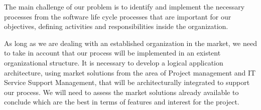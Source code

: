 The main challenge of our problem is to identify and implement the necessary processes from the software life cycle processes that are important for our objectives, defining activities and responsibilities inside the organization.\par
As long as we are dealing with an established organization in the market, we need to take in account that our process will be implemented in an existent organizational structure. It is necessary to develop a logical application architecture, using market solutions from the area of Project management and IT Service Support Management, that will be architecturally integrated to support our process. We will need to assess the market solutions already available to conclude which are the best in terms of features and interest for the project. 
